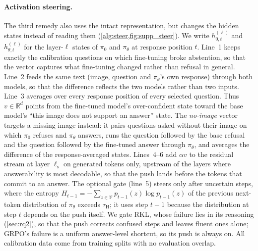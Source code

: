 \paragraph{Activation steering.}
The third remedy also uses the intact representation, but changes the hidden states instead
of reading them (\cref{alg:steer,fig:supp_steer}). We write $h^{(\ell)}_{0,t}$ and $h^{(\ell)}_{\theta,t}$
for the layer-$\ell$ states of $\pi_0$ and $\pi_\theta$ at response position $t$. Line~1
keeps exactly the calibration questions on which fine-tuning broke abstention, so that the
vector captures what fine-tuning changed rather than refusal in general. Line~2 feeds the
same text (image, question and $\pi_\theta$'s own response) through both models, so that the
difference reflects the two models rather than two inputs. Line~3 averages over every
response position of every selected question. Thus $v \in \mathbb{R}^{d}$ points from the
fine-tuned model's over-confident state toward the base model's ``this image does not
support an answer'' state. The \emph{no-image} vector targets a missing image instead: it
pairs questions asked without their image on which $\pi_0$ refuses and $\pi_\theta$
answers, runs the question followed by the base refusal and the question followed by the
fine-tuned answer through $\pi_\theta$, and averages the difference of the
response-averaged states. Lines~4--6 add $\alpha v$ to the residual stream at layer
$\ell_{\mathrm{s}}$ on generated tokens only, upstream of the layers where answerability is
most decodable, so that the push lands before the tokens that commit to an answer. The
optional gate (line~5) steers only after uncertain steps, where the entropy
$H_{t-1} = -\sum_{z \in \mathcal{V}} p_{t-1}(z) \log p_{t-1}(z)$ of the previous
next-token distribution of $\pi_\theta$ exceeds $\tau_{\mathrm{H}}$; it uses step $t-1$
because the distribution at step $t$ depends on the push itself. We gate RKL, whose failure
lies in its reasoning (\cref{sec:rq2}), so that the push corrects confused steps and leaves
fluent ones alone; GRPO's failure is a uniform answer-level shortcut, so its push is always
on. All calibration data come from training splits with no evaluation overlap.
